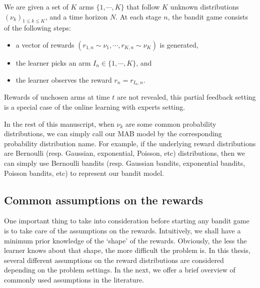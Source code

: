 \begin{definition}\label{def:mab.mab}
\begin{leftbar}[defnbar]
	We are given a set of $K$ arms $\{1,\cdots,K\}$ that follow $K$ unknown distributions $(\nu_k)_{1 \leq k \leq K}$, and a time horizon $N$. At each stage $n$, the bandit game consists of the following steps:
	\begin{itemize}
		\item a vector of rewards $(r_{1,n} \sim \nu_1, \cdots, r_{K,n} \sim \nu_K)$ is generated,
		\item the learner picks an arm $I_n \in \{1,\cdots,K\}$, and
		\item the learner observes the reward $r_n = r_{I_n, n}$.
	\end{itemize}
\end{leftbar}
\end{definition}

\begin{remark}\label{remark:mab.partial}
\begin{leftbar}[remarkbar]
	Rewards of unchosen arms at time $t$ are not revealed, this partial feedback setting is a special case of the online learning with experts setting.
\end{leftbar}
\end{remark}

In the rest of this manuscript, when $\nu_k$ are some common probability distributions, we can simply call our MAB model by the corresponding probability distribution name. For example, if the underlying reward distributions are Bernoulli (resp. Gaussian, exponential, Poisson, etc) distributions, then we can simply use Bernoulli bandits (resp. Gaussian bandits, exponential bandits, Poisson bandits, etc) to represent our bandit model. 

\subsection{Common assumptions on the rewards}\label{sec:mab.model.assumptions}

One important thing to take into consideration before starting any bandit game is to take care of the assumptions on the rewards. Intuitively, we shall have a minimum prior knowledge of the `shape' of the rewards. Obviously, the less the learner knows about that shape, the more difficult the problem is. In this thesis, several different assumptions on the reward distributions are considered depending on the problem settings. In the next, we offer a brief overview of commonly used assumptions in the literature.

